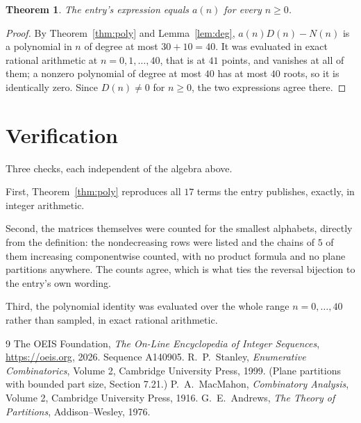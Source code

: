 \documentclass[11pt,a4paper]{article}
\theoremstyle{plain}
\newtheorem{theorem}{Theorem}
\theoremstyle{definition}
\begin{document}
\begin{theorem}
The entry's expression equals $a(n)$ for every $n\ge0$.
\end{theorem}

\begin{proof}
By Theorem~\ref{thm:poly} and Lemma~\ref{lem:deg}, $a(n)D(n)-N(n)$ is a polynomial in $n$
of degree at most $30+10=40$. It was evaluated in exact rational arithmetic at
$n=0,1,\dots,40$, that is at $41$ points, and vanishes at all of them; a nonzero polynomial
of degree at most $40$ has at most $40$ roots, so it is identically zero. Since $D(n)\neq0$
for $n\ge0$, the two expressions agree there.
\end{proof}

\section{Verification}

Three checks, each independent of the algebra above.

First, Theorem~\ref{thm:poly} reproduces all $17$ terms the entry publishes,
exactly, in integer arithmetic.

Second, the matrices themselves were counted for the smallest alphabets, directly from the
definition: the nondecreasing rows were listed and the chains of $5$ of them increasing
componentwise counted, with no product formula and no plane partitions anywhere. The counts
agree, which is what ties the reversal bijection to the entry's own wording.

Third, the polynomial identity was evaluated over the whole range $n=0,\dots,40$ rather than
sampled, in exact rational arithmetic.

\begin{thebibliography}{9}
 The OEIS Foundation, \emph{The On-Line Encyclopedia of Integer
Sequences}, \url{https://oeis.org}, 2026. Sequence A140905.
 R.~P.~Stanley, \emph{Enumerative Combinatorics}, Volume 2, Cambridge
University Press, 1999. (Plane partitions with bounded part size, Section 7.21.)
 P.~A.~MacMahon, \emph{Combinatory Analysis}, Volume 2, Cambridge
University Press, 1916.
 G.~E.~Andrews, \emph{The Theory of Partitions}, Addison--Wesley, 1976.
\end{thebibliography}
\end{document}
